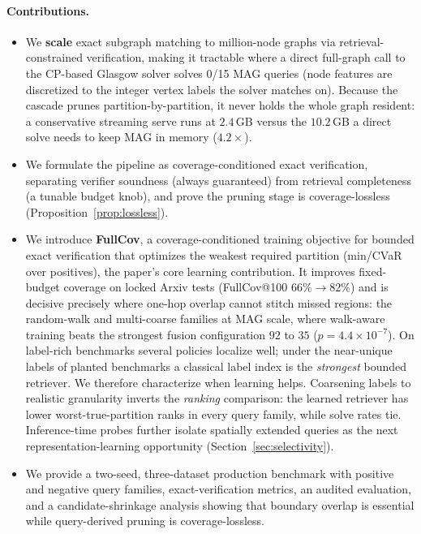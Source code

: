 \documentclass[runningheads]{llncs}
\begin{document}
\paragraph{Contributions.}
\begin{itemize}
    \item We \textbf{scale} exact subgraph matching to million-node graphs via retrieval-constrained verification, making it tractable where a direct full-graph call to the CP-based Glasgow solver solves 0/15 MAG queries (node features are discretized to the integer vertex labels the solver matches on). Because the cascade prunes partition-by-partition, it never holds the whole graph resident: a conservative streaming serve runs at $2.4$\,GB versus the $10.2$\,GB a direct solve needs to keep MAG in memory ($4.2\times$).
    \item We formulate the pipeline as coverage-conditioned exact verification, separating verifier soundness (always guaranteed) from retrieval completeness (a tunable budget knob), and prove the pruning stage is coverage-lossless (Proposition~\ref{prop:lossless}).
    \item We introduce \textbf{FullCov}, a coverage-conditioned training objective for bounded exact verification that optimizes the weakest required partition (min/CVaR over positives), the paper's core learning contribution. It improves fixed-budget coverage on locked Arxiv tests (FullCov@100 $66\%{\to}82\%$) and is decisive precisely where one-hop overlap cannot stitch missed regions: the random-walk and multi-coarse families at MAG scale, where walk-aware training beats the strongest fusion configuration $92$ to $35$ ($p{=}4.4{\times}10^{-7}$). On label-rich benchmarks several policies localize well; under the near-unique labels of planted benchmarks a classical label index is the \emph{strongest} bounded retriever. We therefore characterize when learning helps. Coarsening labels to realistic granularity inverts the \emph{ranking} comparison: the learned retriever has lower worst-true-partition ranks in every query family, while solve rates tie. Inference-time probes further isolate spatially extended queries as the next representation-learning opportunity (Section~\ref{sec:selectivity}).
    \item We provide a two-seed, three-dataset production benchmark with positive and negative query families, exact-verification metrics, an audited evaluation, and a candidate-shrinkage analysis showing that boundary overlap is essential while query-derived pruning is coverage-lossless.
\end{itemize}
\end{document}
